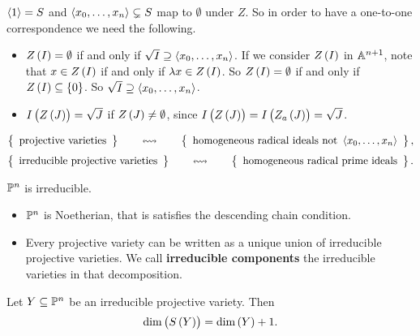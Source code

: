 \begin{note*}
$ \abr{1} = S $ and $ \abr{x_0, \dots, x_n} \subsetneq S $ map to $ \emptyset $ under $ Z $. So in order to have a one-to-one correspondence we need the following.
\begin{itemize}
\item $ Z\br{I} = \emptyset $ if and only if $ \sqrt{I} \supseteq \abr{x_0, \dots, x_n} $. If we consider $ Z\br{I} $ in $ \A^{n + 1} $, note that $ x \in Z\br{I} $ if and only if $ \lambda x \in Z\br{I} $. So $ Z\br{I} = \emptyset $ if and only if $ Z\br{I} \subseteq \cbr{0} $. So $ \sqrt{I} \supseteq \abr{x_0, \dots, x_n} $.
\item $ I\br{Z\br{J}} = \sqrt{J} $ if $ Z\br{J} \ne \emptyset $, since $ I\br{Z\br{J}} = I\br{Z_a\br{J}} = \sqrt{J} $.
\end{itemize}
\end{note*}

\pagebreak

\begin{corollary}
$$ \correspondence{\text{projective varieties}}{\text{homogeneous radical ideals not} \ \abr{x_0, \dots, x_n}}, $$
$$ \correspondence{\text{irreducible projective varieties}}{\text{homogeneous radical prime ideals}}. $$
\end{corollary}

\begin{example}
$ \P^n $ is irreducible.
\end{example}

\begin{proposition}
\hfill
\begin{itemize}
\item $ \P^n $ is Noetherian, that is satisfies the descending chain condition.
\item Every projective variety can be written as a unique union of irreducible projective varieties. We call \textbf{irreducible components} the irreducible varieties in that decomposition.
\end{itemize}
\end{proposition}

\begin{theorem}
Let $ Y \subseteq \P^n $ be an irreducible projective variety. Then
$$ \dim\br{S\br{Y}} = \dim\br{Y} + 1. $$
\end{theorem}


